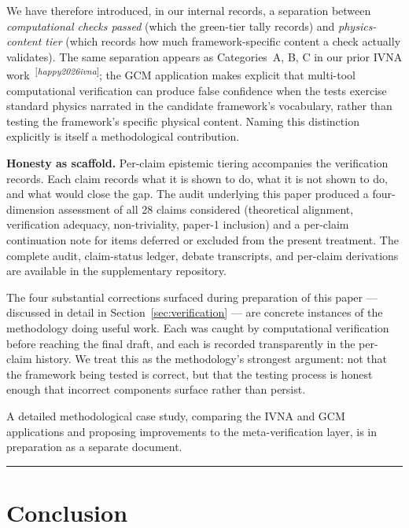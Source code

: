 \documentclass[12pt]{article}
\theoremstyle{definition}
\theoremstyle{remark}
\providecommand{\fallbackcite}[1]{\textsuperscript{[\textit{#1}]}}
\renewcommand{\cite}[1]{\fallbackcite{#1}}
\begin{document}
We have therefore introduced, in our internal records, a separation between \emph{computational checks passed} (which the green-tier tally records) and \emph{physics-content tier} (which records how much framework-specific content a check actually validates). The same separation appears as Categories~A, B, C in our prior IVNA work~\cite{happy2026ivna}; the GCM application makes explicit that multi-tool computational verification can produce false confidence when the tests exercise standard physics narrated in the candidate framework's vocabulary, rather than testing the framework's specific physical content. Naming this distinction explicitly is itself a methodological contribution.

\textbf{Honesty as scaffold.} Per-claim epistemic tiering accompanies the verification records. Each claim records what it is shown to do, what it is not shown to do, and what would close the gap. The audit underlying this paper produced a four-dimension assessment of all 28 claims considered (theoretical alignment, verification adequacy, non-triviality, paper-1 inclusion) and a per-claim continuation note for items deferred or excluded from the present treatment. The complete audit, claim-status ledger, debate transcripts, and per-claim derivations are available in the supplementary repository.

The four substantial corrections surfaced during preparation of this paper --- discussed in detail in Section~\ref{sec:verification} --- are concrete instances of the methodology doing useful work. Each was caught by computational verification before reaching the final draft, and each is recorded transparently in the per-claim history. We treat this as the methodology's strongest argument: not that the framework being tested is correct, but that the testing process is honest enough that incorrect components surface rather than persist.

A detailed methodological case study, comparing the IVNA and GCM applications and proposing improvements to the meta-verification layer, is in preparation as a separate document.

\begin{center}\rule{0.5\linewidth}{0.5pt}\end{center}

\section{Conclusion}\label{sec:conclusion}
\end{document}
